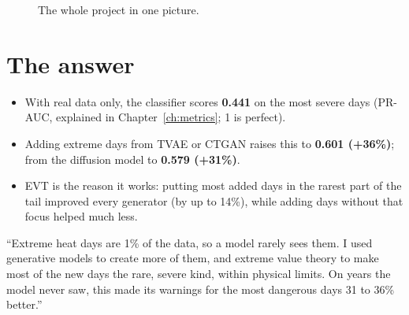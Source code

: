 \begin{figure}[H]
\centering
{}
\caption{The whole project in one picture.}
\end{figure}

\section*{The answer}
\begin{itemize}
  \item With real data only, the classifier scores \textbf{0.441} on the most severe days (PR-AUC, explained in
        Chapter~\ref{ch:metrics}; 1 is perfect).
  \item Adding extreme days from TVAE or CTGAN raises this to \textbf{0.601 (+36\%)}; from the diffusion model to
        \textbf{0.579 (+31\%)}.
  \item EVT is the reason it works: putting most added days in the rarest part of the tail improved every generator
        (by up to 14\%), while adding days without that focus helped much less.
\end{itemize}

\begin{sayit}
``Extreme heat days are 1\% of the data, so a model rarely sees them. I used generative models to create more of them,
and extreme value theory to make most of the new days the rare, severe kind, within physical limits. On years the
model never saw, this made its warnings for the most dangerous days 31 to 36\% better.''
\end{sayit}
